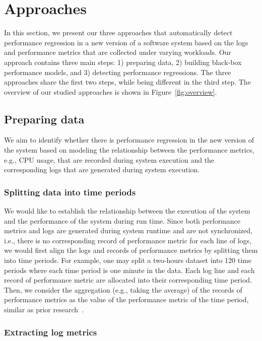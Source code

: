 \section{Approaches} \label{sec:approach}


In this section, we present our three approaches that automatically detect performance regression in a new version of a software system based on the logs and performance metrics that are collected under varying workloads. Our approach contains three main steps: 1) preparing data, 2) building black-box performance models, and 3) detecting performance regressions. The three approaches share the first two steps, while being different in the third step. The overview of our studied approaches is shown in Figure~\ref{fig:overview}.

\subsection{Preparing data}
We aim to identify whether there is performance regression in the new version of the system based on modeling the relationship between the performance metrics, e.g., CPU usage, that are recorded during system execution and the corresponding logs that are generated during system execution.

\subsubsection{Splitting data into time periods}
We would like to establish the relationship between the execution of the system and the performance of the system during run time. Since both performance metrics and logs are generated during system runtime and are not synchronized, i.e., there is no corresponding record of performance metric for each line of logs, we would first align the logs and records of performance metrics by splitting them into time periods. For example, one may split a  two-hours dataset into 120 time periods where each time period is one minute in the data. Each log line and each record of performance metric are allocated into their corresponding time period. Then, we consider the aggregation (e.g., taking the average) of the records of performance metrics as the value of the performance metric of the time period, similar as prior research~\citep{Foo:2010:MPR:1848650.1849222}. 

\subsubsection{Extracting log metrics}

